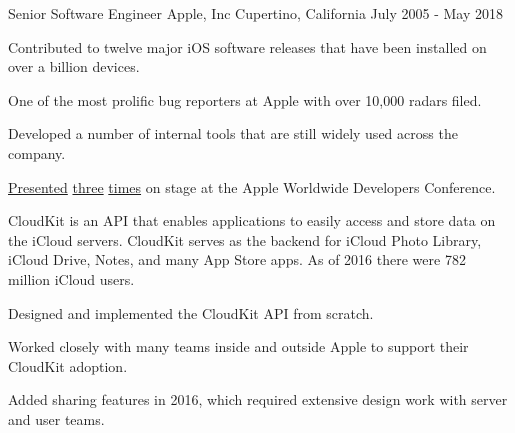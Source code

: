 

\begin{cventries}

  \cventry
    {Senior Software Engineer} %
    {Apple, Inc} %
    {Cupertino, California} %
    {July 2005 - May 2018} %
    {
    \vspace{-2.0mm}
        	\begin{cvitems}
         	\item {Contributed to twelve major iOS software releases that have been installed on over a billion devices.}
         	\item {One of the most prolific bug reporters at Apple with over 10,000 radars filed.}
         	\item {Developed a number of internal tools that are still widely used across the company.}
		\item {\href{https://asciiwwdc.com/2010/sessions/129?q=local\%20notifications}{Presented} \href{https://developer.apple.com/videos/play/wwdc2014/231/}{three} \href{https://developer.apple.com/videos/play/wwdc2016/226/}{times} on stage at the Apple Worldwide Developers Conference.}
          \end{cvitems}
	\begin{cvsubentries}
       		{CloudKit is an API that enables applications to easily access and store data on the iCloud servers. \newline
		CloudKit serves as the backend for iCloud Photo Library, iCloud Drive, Notes, and many App Store apps. As of 2016 there were 782 million iCloud users.
		\vspace{2.0mm}
		\begin{cvitems}
         		\item {Designed and implemented the CloudKit API from scratch.}
         		\item {Worked closely with many teams inside and outside Apple to support their CloudKit adoption.}
         		\item {Added sharing features in 2016, which required extensive design work with server and user teams.}

\end{cvitems}}
\end{cvsubentries}}
\end{cventries}
